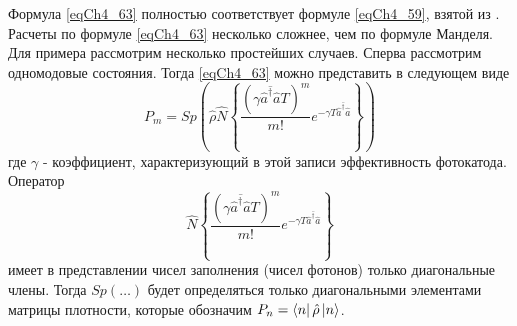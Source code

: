 Формула \eqref{eqCh4_63} полностью соответствует формуле
\eqref{eqCh4_59}, взятой из \cite{bLoudon1976}. Расчеты по
формуле \eqref{eqCh4_63} несколько 
сложнее, чем по формуле Манделя. Для примера рассмотрим несколько
простейших случаев. Сперва рассмотрим одномодовые состояния. Тогда
\eqref{eqCh4_63} можно представить в следующем виде 
\[
P_m = Sp\left(
\hat{\rho}
\hat{N}
\left\{
\frac{\left(\gamma \overline{\hat{a}^{\dag} \hat{a}} T\right)^m}{m!}
e^{- \gamma T \overline{\hat{a}^{\dag} \hat{a}}}
\right\}
\right)
\]
где $\gamma$ - коэффициент, характеризующий в этой записи
эффективность фотокатода. Оператор 
\[
\hat{N}
\left\{
\frac{\left(\gamma \overline{\hat{a}^{\dag} \hat{a}} T\right)^m}{m!}
e^{- \gamma T \overline{\hat{a}^{\dag} \hat{a}}}
\right\}
\]
имеет в представлении чисел заполнения (чисел фотонов) только
диагональные члены. Тогда $Sp\left(\dots\right)$ будет определяться
только диагональными элементами матрицы плотности, 
которые обозначим $P_n = \bra{n}\hat{\rho}\ket{n}$.

